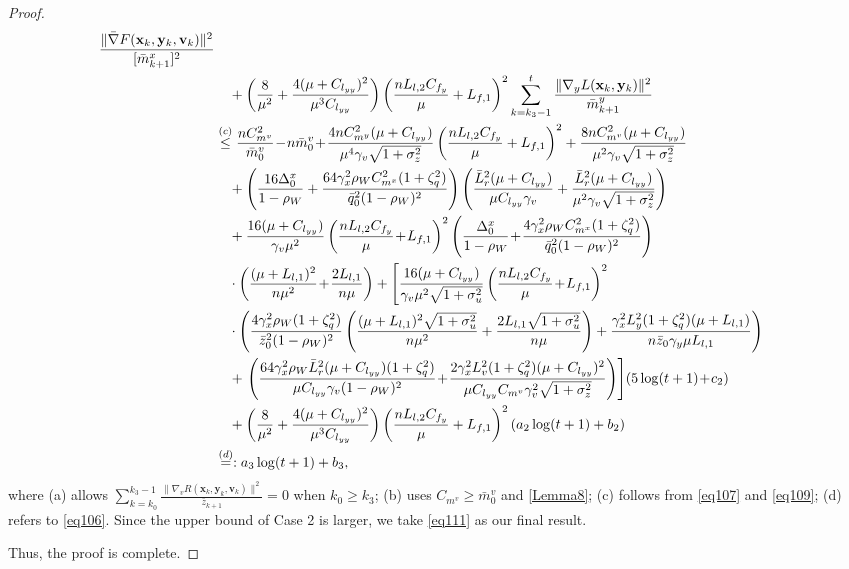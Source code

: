 \documentclass{article}
\theoremstyle{plain}
\theoremstyle{definition}
\theoremstyle{remark}
\begin{document}
\begin{proof}
\begin{align}
 \frac{\| \bar{\nabla} F(\mathbf{x}_{k},\mathbf{y}_{k},\mathbf{v}_{k})\|^2}{[\bar{m}^x_{k+1}]^2}\nonumber\\
&\quad  + \left(\frac{8}{\mu^2}+\frac{4(\mu + C_{l_{yy}})^2}{\mu^3 C_{l_{yy}}} \right)\left(\frac{nL_{l,2}C_{f_y}}{\mu}+L_{f,1}\right)^2 \sum_{k=k_3-1}^t\frac{\|\nabla_y L(\mathbf{x}_k,\mathbf{y}_k)\|^2}{\bar{m}_{k+1}^y}\notag \\
&\overset{(c)}{\leq} \frac{nC_{m^v}^2}{\bar{m}^v_{0}}\! -\! n\bar{m}^v_{0} \!+\! \frac{4nC_{m^y}^2(\mu + C_{l_{yy}})}{\mu^4\gamma_v\sqrt{1+\sigma_z^2}}\left(\frac{nL_{l,2}C_{f_y}}{\mu}+L_{f,1}\right)^2 + \frac{8nC_{m^v}^2(\mu + C_{l_{yy}})}{\mu^2\gamma_v\sqrt{1+\sigma_z^2}}\notag \\ 
&\quad +\left(\frac{16\Delta_0^x}{1-\rho_W}+\frac{64\gamma_x^2\rho_WC_{m^x}^2(1+\zeta_q^2)}{\bar{q}_0^2(1-\rho_W)^2}\right)\left(\frac{ \bar{L}_r^2(\mu + C_{l_{yy}})}{\mu C_{l_{yy}}\gamma_v}+\frac{\bar{L}_r^2(\mu+C_{l_{yy}})}{\mu^2\gamma_v\sqrt{1+\sigma_z^2}}\right)\nonumber\\
&\quad + \frac{16(\mu + C_{l_{yy}})}{\gamma_v\mu^2}\left(\frac{nL_{l,2}C_{f_y}}{\mu}\!+\!L_{f,1}\right)^2 \left(\frac{\Delta_0^x}{1-\rho_W}\!+\!\frac{4 \gamma_x^2 \rho_WC_{m^x}^2 (1 + \zeta_q^2)}{\bar{q}_0^2(1 - \rho_W)^2} \right)\notag\\
&\quad\cdot\left(\frac{(\mu+L_{l,1})^2}{n\mu^2 }\!+\!\frac{2L_{l,1}}{n\mu }\right)+\left[\frac{16(\mu + C_{l_{yy}})}{\gamma_v\mu^2\sqrt{1+\sigma_u^2}}\left(\frac{nL_{l,2}C_{f_y}}{\mu}\!+\!L_{f,1}\right)^2\right.\notag \\
&\quad \cdot\left(\frac{4 \gamma_x^2 \rho_W (1 + \zeta_q^2)}{\bar{z}_0^2(1 - \rho_W)^2} \left(\frac{(\mu+L_{l,1})^2\sqrt{1+\sigma_u^2}}{n\mu^2 }+\frac{2L_{l,1}\sqrt{1+\sigma_u^2}}{n\mu }\right) +\frac{\gamma_x^2L_y^2(1+\zeta_q^2)(\mu + L_{l,1})}{n\bar{z}_0\gamma_y \mu L_{l,1}}\right)\nonumber\\
&\quad + \left.\left(\frac{64 \gamma_x^2 \rho_W \bar{L}_r^2(\mu + C_{l_{yy}})(1 + \zeta_q^2)}{\mu C_{l_{yy}}\gamma_v(1 - \rho_W)^2} \!+\! \frac{2\gamma_x^2L_v^2(1+\zeta_q^2)(\mu + C_{l_{yy}})^2}{\mu C_{l_{yy}}C_{m^v}\gamma_v^2\sqrt{1+\sigma_z^2}}\right)\right]\! (5 \log(t + 1) \!+\! c_2) \notag \\
&\quad  + \left(\frac{8}{\mu^2}+\frac{4(\mu + C_{l_{yy}})^2}{\mu^3 C_{l_{yy}}} \right)\left(\frac{nL_{l,2}C_{f_y}}{\mu}+L_{f,1}\right)^2 (a_2 \log(t + 1) + b_2)\notag \\
&\overset{(d)}{=}:a_3 \log(t + 1) + b_3, \label{eq111}
\end{align}
where (a) allows $\sum_{k=k_0}^{k_3-1} \frac{\|\nabla_v  R(\mathbf{x}_k, \mathbf{y}_k, \mathbf{v}_k)\|^2}{\bar{z}_{k+1}} = 0$ when $k_0 \geq k_3$; (b) uses $C_{m^v} \geq \bar{m}^v_0$ and \cref{Lemma8}; (c) follows from \cref{eq107} and \cref{eq109}; (d) refers to \cref{eq106}. Since the upper bound of Case 2 is larger, we take \cref{eq111} as our final result.

Thus, the proof is complete.
\end{proof}
\end{document}
